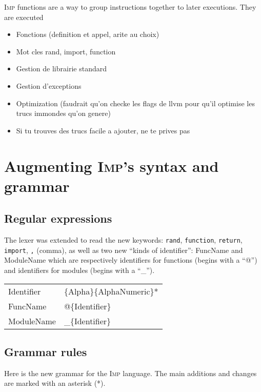 \documentclass[11pt]{article}
\newcommand\imp{\textsc{Imp}\xspace}
\begin{document}
\imp functions are a way to group instructions together to later executions.
They are executed


\begin{itemize}
\item Fonctions (definition et appel, arite au choix)
\item Mot cles rand, import, function
\item Gestion de librairie standard
\item Gestion d'exceptions
\item Optimization (faudrait qu'on checke les flags de llvm pour qu'il optimise les trucs immondes qu'on genere)
\item Si tu trouves des trucs facile a ajouter, ne te prives pas
\end{itemize}

\section{Augmenting \imp's syntax and grammar}

\subsection{Regular expressions}

The lexer was extended to read the new keywords:
\texttt{rand}, \texttt{function}, \texttt{return}, \texttt{import}, \texttt{,} (comma),
as well as two new ``kinds of identifier'': \textsf{FuncName} and \textsf{ModuleName}
which are respectively identifiers for functions (begins with a ``@'')
and identifiers for modules (begins with a ``\_'').

\begin{center}{\sffamily
\begin{tabular}{l @{ = } l}
  Identifier     & \{Alpha\}\{AlphaNumeric\}* \\
  FuncName       & @\{Identifier\} \\
  ModuleName     & \_\{Identifier\} \\
\end{tabular}
}\end{center}

\subsection{Grammar rules}

Here is the new grammar for the \imp language.
The main additions and changes are marked with an asterisk (\textsf{*}).
\end{document}
